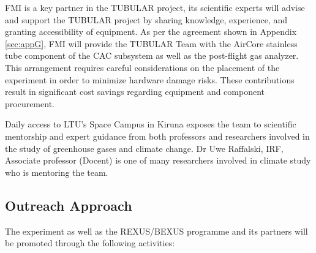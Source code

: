 \documentclass[a4paper,12pt,twoside]{article}
\begin{document}
FMI is a key partner in the TUBULAR project, its scientific experts will advise and support the TUBULAR project by sharing knowledge, experience, and granting accessibility of equipment. As per the agreement shown in Appendix \ref{sec:appG}, FMI will provide the TUBULAR Team with the AirCore stainless tube component of the CAC subsystem as well as the post-flight gas analyzer. This arrangement requires careful considerations on the placement of the experiment in order to minimize hardware damage risks. These contributions result in significant cost savings regarding equipment and component procurement.

Daily access to LTU's Space Campus in Kiruna exposes the team to scientific mentorship and expert guidance from both professors and researchers involved in the study of greenhouse gases and climate change. Dr Uwe Raffalski, IRF, Associate professor (Docent) is one of many researchers involved in climate study who is mentoring the team.
\pagebreak

\subsection{Outreach Approach}

The experiment as well as the REXUS/BEXUS programme and its partners will be promoted through the following activities:
\end{document}
